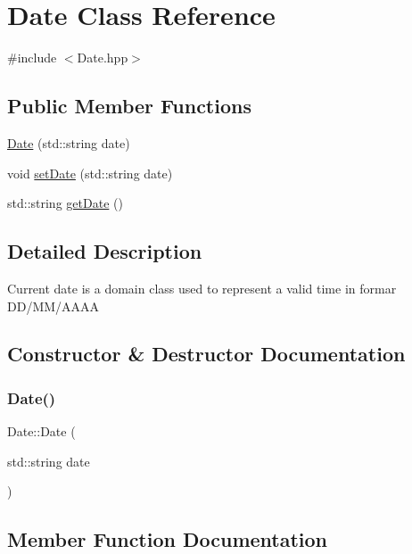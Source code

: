 \hypertarget{class_date}{}\section{Date Class Reference}
\label{class_date}


{\ttfamily \#include $<$Date.\+hpp$>$}

\subsection*{Public Member Functions}
\begin{DoxyCompactItemize}
\item 
\mbox{\hyperlink{class_date_ae511a4802384a715301536ee81aafc99}{Date}} (std\+::string date)
\item 
void \mbox{\hyperlink{class_date_a5b25692df4700680653cec7185d26124}{set\+Date}} (std\+::string date)
\item 
std\+::string \mbox{\hyperlink{class_date_afee39b368675bb70bdb29878de7fc427}{get\+Date}} ()
\end{DoxyCompactItemize}


\subsection{Detailed Description}
Current date is a domain class used to represent a valid time in formar D\+D/\+M\+M/\+A\+A\+AA 

\subsection{Constructor \& Destructor Documentation}
\mbox{\label{class_date_ae511a4802384a715301536ee81aafc99}} 
\subsubsection{\texorpdfstring{Date()}{Date()}}
{\footnotesize\ttfamily Date\+::\+Date (\begin{DoxyParamCaption}\item[{std\+::string}]{date }\end{DoxyParamCaption})}



\subsection{Member Function Documentation}
\mbox{\label{class_date_afee39b368675bb70bdb29878de7fc427}} 
